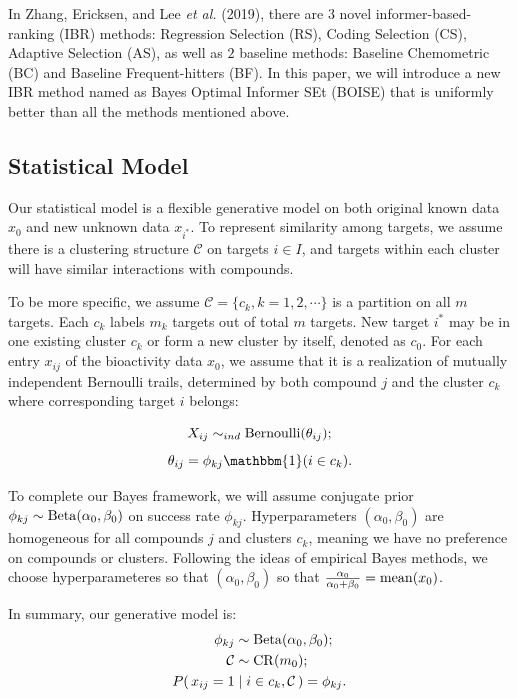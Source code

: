 \documentclass[12pt]{article}
\begin{document}
In Zhang, Ericksen, and Lee {\em et al.} (2019), there are $3$ novel informer-based-ranking (IBR) methods: Regression Selection (RS), Coding Selection (CS), Adaptive Selection (AS), as well as $2$ baseline methods: Baseline Chemometric (BC) and Baseline Frequent-hitters (BF). In this paper, we will introduce a new IBR method named as Bayes Optimal Informer SEt (BOISE) that is uniformly better than all the methods mentioned above.

\subsection{Statistical Model}

Our statistical model is a flexible generative model on both original known data $x_0$ and new unknown data $x_{i^*}$. 
To represent similarity among targets, we assume there is a clustering structure $\mathcal{C}$ on targets $i\in I$, and targets within each cluster will have similar interactions with compounds. 

To be more specific, we assume $\mathcal{C} = \{c_k, k = 1,2,\cdots\}$ is a partition on all $m$ targets. Each $c_k$ labels $m_k$ targets out of total $m$ targets. New target $i^*$ may be in one existing cluster $c_k$ or form a new cluster by itself, denoted as $c_0$. For each entry $x_{ij}$ of the bioactivity data $x_0$, we assume that it is a realization of mutually independent Bernoulli trails,  determined by both compound $j$ and the cluster $c_k$ where corresponding target $i$ belongs: 

$$
X_{ij}\sim_{ind} {\rm Bernoulli}(\theta_{ij});$$$$
\theta_{ij} = \phi_{kj}\mathbbm{1}(i\in c_k).
$$

To complete our Bayes framework, we will assume conjugate prior  $\phi_{kj}\sim {\rm Beta}(\alpha_0, \beta_0)$ on success rate $\phi_{kj}$. Hyperparameters $(\alpha_0,\beta_0)$ are homogeneous for all compounds $j$ and clusters $c_k$, meaning we have no preference on compounds or clusters. Following the ideas of empirical Bayes methods,  we choose hyperparameteres so that $(\alpha_0,\beta_0)$ so that $\frac{\alpha_0}{\alpha_0+\beta_0} = {\rm mean}(x_0)$. 

In summary, our generative model is:
\begin{align}
\label{eq:model}
\begin{split}
    \phi_{kj}&\sim {\rm Beta}(\alpha_0,\beta_0);\\
\mathcal{C} &\sim {\rm CR}(m_0);\\
P(\,x_{ij}=1&\mid i\in c_k, \mathcal{C}\,)= \phi_{kj}.
\end{split}
\end{align}
\end{document}
